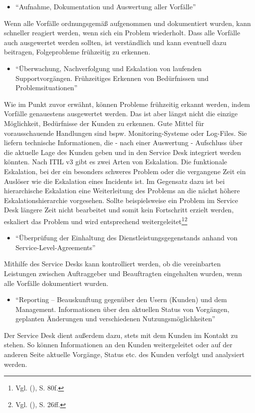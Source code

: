 \begin{itemize}
\item \enquote{Aufnahme, Dokumentation und Auswertung aller Vorfälle}
\end{itemize}
\noindent
Wenn alle Vorfälle ordnungsgemäß aufgenommen und dokumentiert wurden, kann schneller reagiert werden, wenn sich ein Problem wiederholt. Dass alle Vorfälle auch ausgewertet werden sollten, ist verständlich und kann eventuell dazu beitragen, Folgeprobleme frühzeitig zu erkennen.

\begin{itemize}
\item \enquote{Überwachung, Nachverfolgung und Eskalation von laufenden
Supportvorgängen. Frühzeitiges Erkennen von
Bedürfnissen und Problemsituationen}
\end{itemize}
\noindent
Wie im Punkt zuvor erwähnt, können Probleme frühzeitig erkannt werden, indem Vorfälle genauestens ausgewertet werden. Das ist aber längst nicht die einzige Möglichkeit, Bedürfnisse der Kunden zu erkennen. Gute Mittel für vorausschauende Handlungen sind  bspw. Monitoring-Systeme oder Log-Files. Sie liefern technische Informationen, die - nach einer Auswertung - Aufschluss über die aktuelle Lage des Kunden geben und in den Service Desk integriert werden könnten. Nach ITIL v3 gibt es zwei Arten von Eskalation. Die funktionale Eskalation, bei der ein besonders schweres Problem oder die vergangene Zeit ein Auslöser wie die Eskalation eines Incidents ist. Im Gegensatz dazu ist bei hierarchische Eskalation eine Weiterleitung des Problems an die nächst höhere Eskalationshierarchie vorgesehen. Sollte beispielsweise ein Problem im Service Desk längere Zeit nicht bearbeitet und somit kein Fortschritt erzielt werden, eskaliert das Problem und wird entsprechend weitergeleitet\footnote{Vgl. \citeauthor{ITILBuch} (\citeyear{Victor}), S. 80f.}\footnote{Vgl. \citeauthor{Victor} (\citeyear{Victor}), S. 26ff.}


\begin{itemize}
\item \enquote{Überprüfung der Einhaltung des Dienstleistungsgegenstands
anhand von Service-Level-Agreements}
\end{itemize}
\noindent
Mithilfe des Service Desks kann kontrolliert werden, ob die vereinbarten Leistungen zwischen Auftraggeber und Beauftragten eingehalten wurden, wenn alle Vorfälle dokumentiert wurden.

\begin{itemize}
\item \enquote{Reporting – Beauskunftung gegenüber den Usern (Kunden)
und dem Management. Informationen über den aktuellen
Status von Vorgängen, geplanten Änderungen und
verschiedenen Nutzungsmöglichkeiten}
\end{itemize}
\noindent
Der Service Desk dient außerdem dazu, stets mit dem Kunden im Kontakt zu stehen. So können Informationen an den Kunden weitergeleitet oder auf der anderen Seite aktuelle Vorgänge, Status etc. des Kunden verfolgt und analysiert werden. 

